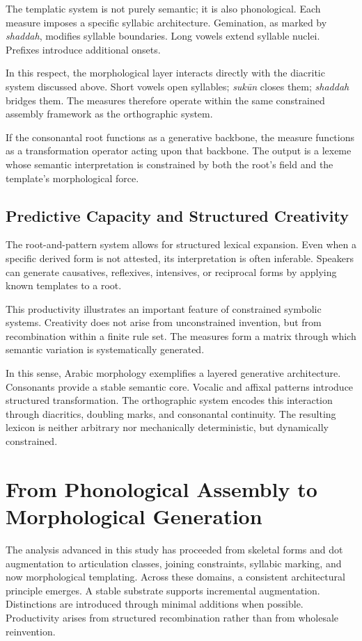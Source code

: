 \documentclass[11pt]{article}
\begin{document}
The templatic system is not purely semantic; it is also phonological. Each measure imposes a specific syllabic architecture. Gemination, as marked by \textit{shaddah}, modifies syllable boundaries. Long vowels extend syllable nuclei. Prefixes introduce additional onsets.

In this respect, the morphological layer interacts directly with the diacritic system discussed above. Short vowels open syllables; \textit{sukūn} closes them; \textit{shaddah} bridges them. The measures therefore operate within the same constrained assembly framework as the orthographic system.

If the consonantal root functions as a generative backbone, the measure functions as a transformation operator acting upon that backbone. The output is a lexeme whose semantic interpretation is constrained by both the root’s field and the template’s morphological force.

\subsection{Predictive Capacity and Structured Creativity}

The root-and-pattern system allows for structured lexical expansion. Even when a specific derived form is not attested, its interpretation is often inferable. Speakers can generate causatives, reflexives, intensives, or reciprocal forms by applying known templates to a root.

This productivity illustrates an important feature of constrained symbolic systems. Creativity does not arise from unconstrained invention, but from recombination within a finite rule set. The measures form a matrix through which semantic variation is systematically generated.

In this sense, Arabic morphology exemplifies a layered generative architecture. Consonants provide a stable semantic core. Vocalic and affixal patterns introduce structured transformation. The orthographic system encodes this interaction through diacritics, doubling marks, and consonantal continuity. The resulting lexicon is neither arbitrary nor mechanically deterministic, but dynamically constrained.

\section{From Phonological Assembly to Morphological Generation}

The analysis advanced in this study has proceeded from skeletal forms and dot augmentation to articulation classes, joining constraints, syllabic marking, and now morphological templating. Across these domains, a consistent architectural principle emerges. A stable substrate supports incremental augmentation. Distinctions are introduced through minimal additions when possible. Productivity arises from structured recombination rather than from wholesale reinvention.
\end{document}
